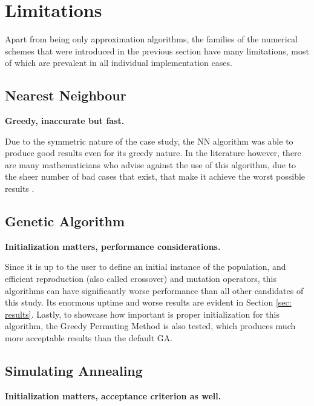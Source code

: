 
\section{Limitations}
\label{sec: limitations}

Apart from being only approximation algorithms, the families of  the numerical schemes that were introduced in the previous section have many limitations, most of which are prevalent in all individual implementation cases.

\subsection{Nearest Neighbour}
\textbf{Greedy, inaccurate but fast.}

Due to the symmetric nature of the case study, the NN algorithm was able to produce good results even for its greedy nature. In the literature however, there are many mathematicians who advise against the use of this algorithm, due to the sheer number of bad cases that exist, that make it achieve the worst possible results \cite{gutin2002traveling}.

\subsection{Genetic Algorithm}
\textbf{Initialization matters, performance considerations.}

Since it is up to the user to define an initial instance of the population, and efficient reproduction (also called crossover) and mutation operators, this algorithms can have significantly worse performance than all other candidates of this study. Its enormous uptime and worse results are evident in Section \ref{sec: results}. Lastly, to showcase how important is proper initialization for this algorithm, the Greedy Permuting Method \cite{liu2018greedy} is also tested, which produces much more acceptable results than the default GA.

\subsection{Simulating Annealing}
\textbf{Initialization matters, acceptance criterion as well.}

